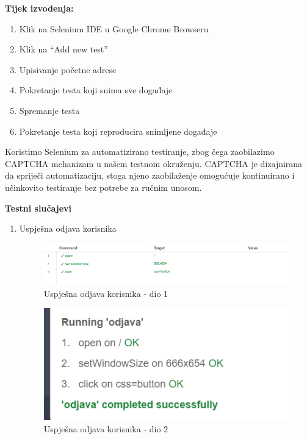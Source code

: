 			\textbf{Tijek izvodenja:}
			\begin{enumerate}
				\item Klik na Selenium IDE u Google Chrome Browseru
				\item Klik na “Add new test”
				\item Upisivanje početne adrese
				\item Pokretanje testa koji snima sve događaje
				\item Spremanje testa
				\item Pokretanje testa koji reproducira snimljene događaje
			\end{enumerate}
			
			Koristimo Selenium za automatizirano testiranje, zbog čega zaobilazimo CAPTCHA mehanizam u našem testnom okruženju. CAPTCHA je dizajnirana da spriječi automatizaciju, stoga njeno zaobilaženje omogućuje kontinuirano i učinkovito testiranje bez potrebe za ručnim unosom.
			
			\textbf{Testni slučajevi}
			\begin{enumerate}
				\item Uspješna odjava korisnika
				\begin{figure}[H]
					\includegraphics[scale=0.30]{slike/deploy/fTest2a.png}
					\centering
					\caption{Uspješna odjava korisnika - dio 1}
					\label{fig:fTest2a}
				\end{figure}
				\begin{figure}[H]
					\includegraphics[scale=0.30]{slike/deploy/fTest2b.png}
					\centering
					\caption{Uspješna odjava korisnika - dio 2}
					\label{fig:fTest2b}
				\end{figure}
			\end{enumerate}
			
